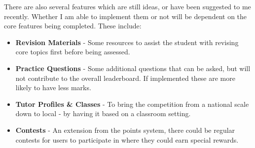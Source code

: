 \documentclass[]{final_report}
\begin{document}
There are also several features which are still ideas, or have been suggested to me recently. Whether I am able to implement them or not will be dependent on the core features being completed. These include:

\begin{itemize}
	\item \textbf{Revision Materials} - Some resources to assist the student with revising core topics first before being assessed.
	\item \textbf{Practice Questions} - Some additional questions that can be asked, but will not contribute to the overall leaderboard. If implemented these are more likely to have less marks.
	\item \textbf{Tutor Profiles \& Classes} - To bring the competition from a national scale down to local - by having it based on a classroom setting. 
	\item \textbf{Contests} - An extension from the points system, there could be regular contests for users to participate in where they could earn special rewards.
\end{itemize}
\end{document}
